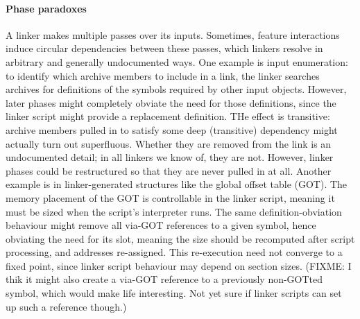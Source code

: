 \paragraph{Phase paradoxes} A linker makes multiple passes over its inputs.
Sometimes, feature interactions induce circular dependencies between
these passes, which linkers resolve in arbitrary and generally undocumented ways.
One example is input enumeration: to identify which archive members
to include in a link, the linker searches archives for definitions
of the symbols required by other input objects.
However, later phases might completely obviate the need for those definitions, 
since the linker script might provide a replacement definition.
THe effect is transitive: archive members pulled in to satisfy some deep
(transitive) dependency might actually turn out superfluous.
Whether they are removed from the link is an undocumented detail; 
in all linkers we know of, they are not.
However, linker phases could be restructured so that they are never pulled in at all.
Another example is in linker-generated structures like the global offset table (GOT). 
The memory placement of the GOT is controllable in the linker script,
meaning it must be sized when the script's interpreter runs. 
The same definition-obviation behaviour might remove all via-GOT references
to a given symbol, hence obviating the need for its slot, meaning the size
should be recomputed after script processing, and addresses re-assigned.
This re-execution need not converge to a fixed point, since linker script behaviour
may depend on section sizes.
(FIXME: I thik it might also create a via-GOT reference
to a previously non-GOTted symbol, which would make life interesting.
Not yet sure if linker scripts can set up such a reference though.)

